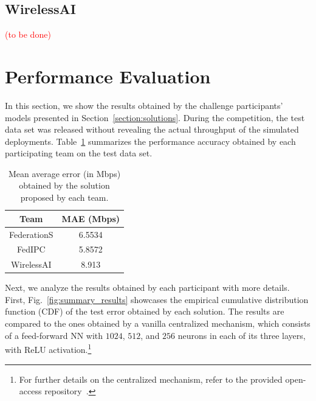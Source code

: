 \documentclass[10pt,a4paper,twocolumn]{article}
\newcommand{\ITUpar}{\vspace{8pt}\par}
\def\starttable{\vspace{6pt}\begin{table}[ht]\center}
\begin{document}

\subsection{WirelessAI}

\textcolor{red}{(to be done)}


\section{Performance Evaluation}
\label{section:performance}

In this section, we show the results obtained by the challenge participants' models presented in Section~\ref{section:solutions}. During the competition, the test data set was released without revealing the actual throughput of the simulated deployments. Table~\ref{tab:summary_results} summarizes the performance accuracy obtained by each participating team on the test data set. \ITUpar

\starttable
	\caption{Mean average error (in Mbps) obtained by the solution proposed by each team.}
	\label{tab:summary_results}
	\begin{tabular}{|c|c|}
		\hline
		\textbf{Team} & \textbf{MAE (Mbps)} \\ \hline
		FederationS & 6.5534 \\ \hline
		FedIPC & 5.8572 \\ \hline
		WirelessAI & 8.913 \\ \hline	
	\end{tabular}
\end{table}

Next, we analyze the results obtained by each participant with more details. First, Fig.~\ref{fig:summary_results} showcases the empirical cumulative distribution function (CDF) of the test error obtained by each solution. The results are compared to the ones obtained by a vanilla centralized mechanism, which consists of a feed-forward NN with $1024$, $512$, and $256$ neurons in each of its three layers, with ReLU activation.\footnote{For further details on the centralized mechanism, refer to the provided open-access repository~\cite{github_challenge}.}
\end{document}
